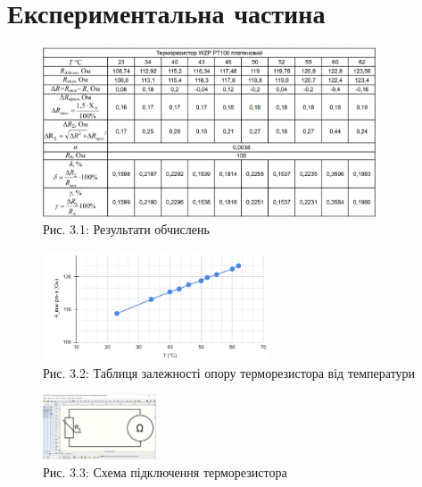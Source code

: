\documentclass[a4paper]{article}
\begin{document}
\newpage 



\section*{Експериментальна частина}

\begin{figure}[h]
    \centering
\includegraphics[width=0.88\textwidth]{imgs/LW3.1.png}
    \caption*{Рис. 3.1: Результати обчислень}
\end{figure} 

\begin{figure}[h]
    \centering
\includegraphics[width=0.6\textwidth]{imgs/LW3.3.png}
    \caption*{Рис. 3.2: Таблиця залежності опору терморезистора від температури}
\end{figure} 

\begin{figure}[h]
    \centering
\includegraphics[width=0.3\textwidth]{imgs/LW3.2.png}
    \caption*{Рис. 3.3: Схема підключення терморезистора}
\end{figure} 
\end{document}
